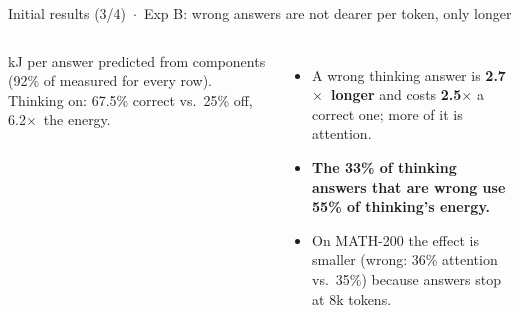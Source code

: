 \documentclass[aspectratio=169,9pt]{beamer}
\newcommand{\x}{$\times$}
\begin{document}
\begin{frame}{Initial results (3/4) \,$\cdot$\, Exp B: wrong answers are not dearer per token, only longer}
\begin{columns}[T,onlytextwidth]
    {\tiny\color{muted}kJ per answer predicted from components (92\% of measured for every row). Thinking on: 67.5\% correct vs.\ 25\% off, 6.2\x\ the energy.\par}
    \begin{itemize}\scriptsize
      \item A wrong thinking answer is \textbf{2.7\x\ longer} and costs \textbf{2.5\x} a correct one; more of it is attention.
      \item \textbf{The 33\% of thinking answers that are wrong use 55\% of thinking's energy.}
      \item On MATH-200 the effect is smaller (wrong: 36\% attention vs.\ 35\%) because answers stop at 8k tokens.
    \end{itemize}
  \end{columns}
\end{frame}
\end{document}
